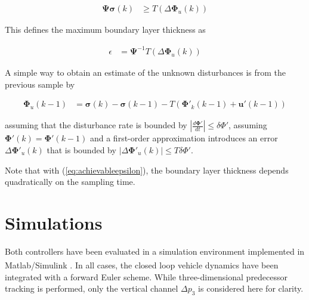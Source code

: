 \documentclass{ifacconf}
\providecommand{\mbf}[1]{\mathbf{#1}}
\newcommand{\idxSample}{{\ensuremath{k}}}
\begin{document}
\begin{align}
\mbf{\Psi} \mbf{\sigma}(\idxSample) & \geq T (\Delta \mbf{\Phi}_u(\idxSample))
\end{align}

This defines the maximum boundary layer thickness as

\begin{align}
\epsilon &=
\mbf{\Psi}^{-1} T (\Delta \mbf{\Phi}_u(\idxSample))
\label{eq:achievableepsilon}
\end{align}

%
%
%



A simple way to obtain an estimate of the unknown disturbances is from the previous sample by

\begin{align}
\mbf{\Phi}_u(\idxSample-1) &=
\mbf{\sigma}(\idxSample)
-
\mbf{\sigma}(\idxSample-1)
-
T
(\mbf{\Phi}'_k(\idxSample-1) + \mbf{u}'(\idxSample-1))
\end{align}

assuming that the disturbance rate is bounded by $|\frac{d \mbf{\Phi}'}{dt}| \leq \delta \Phi'$, assuming $\mbf{\Phi}'(\idxSample) = \mbf{\Phi}'(\idxSample-1)$ and a first-order approximation introduces an error $\Delta \mbf{\Phi}'_u(\idxSample)$ that is bounded by $|\Delta \mbf{\Phi}'_u(\idxSample)| \leq T \delta \Phi' $.

Note that with (\ref{eq:achievableepsilon}), the boundary layer thickness depends quadratically on the sampling time.

\section{Simulations}
\label{sec:simulations}

Both controllers have been evaluated in a simulation environment implemented in Matlab\textsuperscript{\tiny \textregistered}/Simulink\textsuperscript{\tiny \textregistered} 
. In all cases, the closed loop vehicle dynamics have been integrated with a forward Euler scheme. While three-dimensional predecessor tracking is performed, only the vertical channel $\Delta p_3$ is considered here for clarity.
\end{document}
